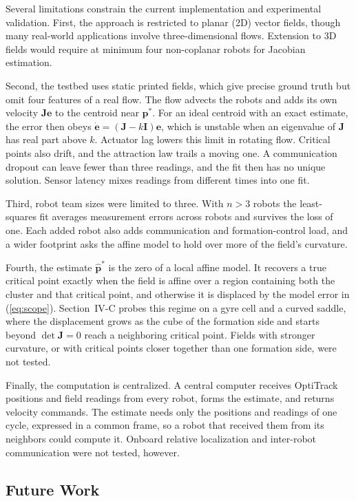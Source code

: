 \documentclass[lettersize,journal]{IEEEtran}
\begin{document}
Several limitations constrain the current implementation and experimental validation. First, the approach is restricted to planar (2D) vector fields, though many real-world applications involve three-dimensional flows. Extension to 3D fields would require at minimum four non-coplanar robots for Jacobian estimation.

Second, the testbed uses static printed fields, which give precise ground truth but omit four features of a real flow. The flow advects the robots and adds its own velocity $\mathbf{J}\mathbf{e}$ to the centroid near $\mathbf{p}^*$. For an ideal centroid with an exact estimate, the error then obeys $\dot{\mathbf{e}} = (\mathbf{J} - k\mathbf{I})\mathbf{e}$, which is unstable when an eigenvalue of $\mathbf{J}$ has real part above $k$. Actuator lag lowers this limit in rotating flow. Critical points also drift, and the attraction law trails a moving one. A communication dropout can leave fewer than three readings, and the fit then has no unique solution. Sensor latency mixes readings from different times into one fit.

Third, robot team sizes were limited to three. With $n > 3$ robots the least-squares fit averages measurement errors across robots and survives the loss of one. Each added robot also adds communication and formation-control load, and a wider footprint asks the affine model to hold over more of the field's curvature.

Fourth, the estimate $\hat{\mathbf{p}}^*$ is the zero of a local affine model. It recovers a true critical point exactly when the field is affine over a region containing both the cluster and that critical point, and otherwise it is displaced by the model error in (\ref{eq:scope}). Section~IV-C probes this regime on a gyre cell and a curved saddle, where the displacement grows as the cube of the formation side and starts beyond $\det\mathbf{J} = 0$ reach a neighboring critical point. Fields with stronger curvature, or with critical points closer together than one formation side, were not tested.

Finally, the computation is centralized. A central computer receives OptiTrack positions and field readings from every robot, forms the estimate, and returns velocity commands. The estimate needs only the positions and readings of one cycle, expressed in a common frame, so a robot that received them from its neighbors could compute it. Onboard relative localization and inter-robot communication were not tested, however.

\subsection{Future Work}
\end{document}
